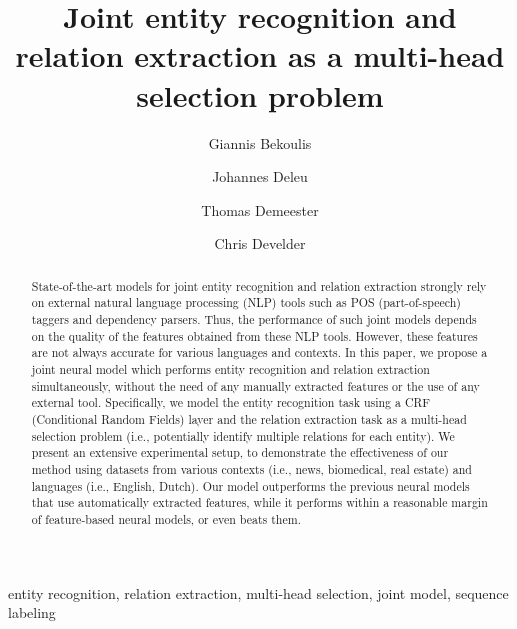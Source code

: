 \documentclass[review]{elsarticle}
\newcommand{\ie}{i.e., }
\begin{document}
\setlength{\abovedisplayskip}{3pt}
\setlength{\belowdisplayskip}{3pt}


\begin{frontmatter}


\title{Joint entity recognition and relation extraction as a multi-head selection problem }


\author[]{Giannis Bekoulis}
\author[]{Johannes Deleu}
\author[]{Thomas Demeester}
\author[]{Chris Develder}
\address{Ghent University -- imec, IDLab, Department of Information Technology,\\
Technologiepark Zwijnaarde 15, 9052 Ghent, Belgium}



\begin{abstract}
State-of-the-art models for joint entity recognition and relation extraction strongly rely on external natural language processing (NLP) tools such as POS (part-of-speech) taggers and dependency parsers. Thus, the performance of such joint models depends on the quality of the features obtained from these NLP tools. However, these features are not always accurate for various languages and contexts. In this paper, we propose a joint neural model which performs entity recognition and relation extraction simultaneously, without the need of any manually extracted features or the use of any external tool. Specifically, we model the entity recognition task using a CRF (Conditional Random Fields) layer and the relation extraction task as a multi-head selection problem (\ie potentially identify multiple relations for each entity). We present an extensive experimental setup, to demonstrate the effectiveness of our method using datasets from various contexts (\ie news, biomedical, real estate) and languages (\ie English, Dutch). Our model outperforms the previous neural models that use automatically extracted features, while it performs within a reasonable margin of feature-based neural models, or even beats them.
\end{abstract}

\begin{keyword}
entity recognition, relation extraction, multi-head selection, joint model, sequence labeling
\end{keyword}

\end{frontmatter}
\end{document}

